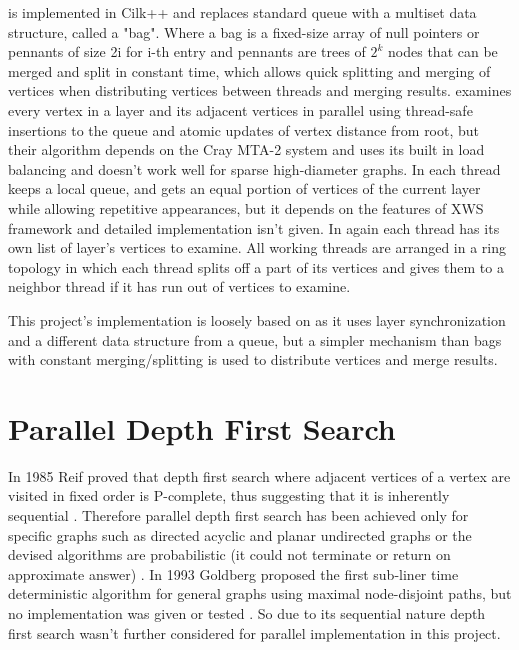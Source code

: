 \documentclass{report}
\theoremstyle{plain}
\theoremstyle{definition}
\theoremstyle{remark}
\begin{document}
\cite{Leiserson} is implemented in Cilk++ and replaces standard queue with a multiset data structure, called a "bag". Where a bag is a fixed-size array of null pointers or pennants of size 2i for i-th entry and pennants are trees of $2^k$ nodes that can be merged and split in constant time, which allows quick splitting and merging of vertices when distributing vertices between threads and merging results.
\cite{bader2006designing} examines every vertex in a layer and its adjacent vertices in parallel using thread-safe insertions to the queue and atomic updates of vertex distance from root, but their algorithm depends on the Cray MTA-2 system and uses its built in load balancing and doesn't work well for sparse high-diameter graphs.
In \cite{cong2008solving} each thread keeps a local queue, and gets an equal portion of vertices of the current layer while allowing repetitive appearances, but it depends on the features of XWS framework and detailed implementation isn't given.
In \cite{zhang2006parallel} again each thread has its own list of layer's vertices to examine. All working threads are arranged in a ring topology in which each thread splits off a part of its vertices and gives them to a neighbor thread if it has run out of vertices to examine.

This project's implementation is loosely based on \cite{Leiserson} as it uses layer synchronization and a different data structure from a queue, but a simpler mechanism than bags with constant merging/splitting is used to distribute vertices and merge results.

\section{Parallel Depth First Search}

In 1985 Reif proved that depth first search where adjacent vertices of a vertex are visited in fixed order is P-complete, thus suggesting that it is inherently sequential \cite{reif1985depth}. Therefore parallel depth first search has been achieved only for specific graphs such as directed acyclic \cite{ghosh1984parallel} and planar undirected graphs \cite{hagerup1990planar} or the devised algorithms are probabilistic (it could not terminate or return on approximate answer) \cite{aggarwal1989parallel}. In 1993 Goldberg proposed the first sub-liner time deterministic algorithm for general graphs using maximal node-disjoint paths, but no implementation was given or tested \cite{goldberg1993sublinear}. So due to its sequential nature depth first search wasn't further considered for parallel implementation in this project.
\end{document}
